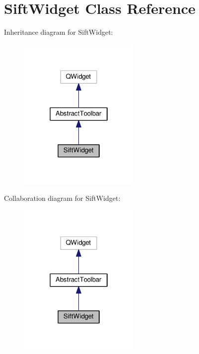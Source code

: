 \hypertarget{classSiftWidget}{}\section{Sift\+Widget Class Reference}
\label{classSiftWidget}


Inheritance diagram for Sift\+Widget\+:\nopagebreak
\begin{figure}[H]
\begin{center}
\leavevmode
\includegraphics[width=166pt]{classSiftWidget__inherit__graph}
\end{center}
\end{figure}


Collaboration diagram for Sift\+Widget\+:\nopagebreak
\begin{figure}[H]
\begin{center}
\leavevmode
\includegraphics[width=166pt]{classSiftWidget__coll__graph}
\end{center}
\end{figure}
